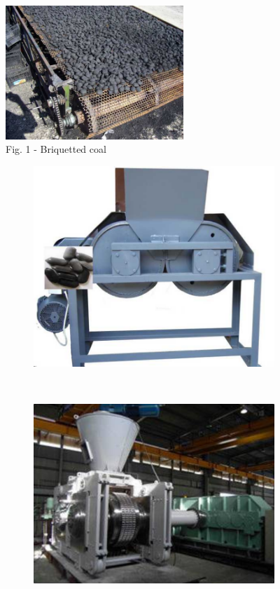 \begin{figure}[H]
	\centering
	\includegraphics[width=0.6\textwidth]{media/gorn2/image2}
	\caption*{Fig. 1 - Briquetted coal}
\end{figure}

\begin{figure}[H]
  \centering
  \begin{subfigure}{0.45\textwidth}
    \includegraphics[width=\textwidth]{media/gorn2/image3}
  \end{subfigure}%
  ~%
  \begin{subfigure}{0.45\textwidth}
    \includegraphics[width=\textwidth]{media/gorn2/image4}

\end{subfigure}
\end{figure}
